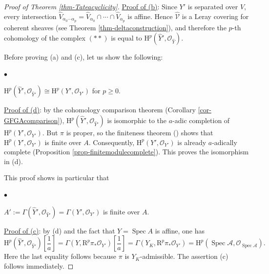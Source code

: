 \documentclass[a4paper,12pt, dvipdfmx]{jsbook}
\def\O{\mathscr{O}}
\def\Spec{\mathop{\mathrm{Spec}}\nolimits}
\def\H{\mathrm{H}}
\def\RD{\mathrm{R}}
\renewenvironment{itemize}%
{%
   \begin{list}{\parbox{1zw}{$\bullet$}}%
   {%
      \setlength{\topsep}{.5zh}
      \setlength{\itemindent}{0zw}
      \setlength{\leftmargin}{3zw}%
      \setlength{\rightmargin}{0zw}%
      \setlength{\labelsep}{.5zw}%
      \setlength{\labelwidth}{3zw}%
      \setlength{\itemsep}{0.2em}%
      \setlength{\parsep}{0em}%
      \setlength{\listparindent}{0zw}%
   }
}{%
   \end{list}%
}
\theoremstyle{plain}
\theoremstyle{definition}
\begin{document}
\begin{proof}[{{\rm Proof of Theorem \ref{thm-Tateacyclicity}}}]
\medskip\noindent
\underline{Proof of (b)}:
Since $Y'$ is separated over $V$, every intersection $\widehat{V}_{\alpha_0\cdots\alpha_p}=\widehat{V}_{\alpha_0}\cap\cdots\cap\widehat{V}_{\alpha_p}$ is affine.
Hence $\widehat{\mathcal{V}}$ is a Leray covering for coherent sheaves (see Theorem \ref{thm-deltaconstruction}), and therefore the $p$-th cohomology of the complex $(\ast\ast)$ is equal to $\H^p(\widehat{Y}',\O_{\widehat{Y}})$.

\medskip
Before proving (a) and (c), let us show the following:
\begin{itemize}
\item[(d)] $\H^p(\widehat{Y}',\O_{\widehat{Y}'})\cong\H^p(Y',\O_{Y'})$ for $p\geq 0$.
\end{itemize}

\medskip\noindent
\underline{Proof of (d)}: by the cohomology comparison theorem (Corollary \ref{cor-GFGAcomparison}), $\H^p(\widehat{Y}',\O_{\widehat{Y}'})$ is isomorphic to the $a$-adic completion of $\H^p(Y',\O_{Y'})$.
But $\pi$ is proper, so the finiteness theorem (\cite[Chap.\ III, Theorem 8.8, Remark 8.8.1]{Hart2}) shows that $\H^p(Y',\O_{Y'})$ is finite over $A$.
Consequently, $\H^p(Y',\O_{Y'})$ is already $a$-adically complete (Proposition \ref{prop-finitemodulecomplete}).
This proves the isomorphism in (d).

\medskip
This proof shows in particular that
\begin{itemize}
\item[(e)] $A':=\Gamma(\widehat{Y}',\O_{\widehat{Y}'})=\Gamma(Y',\O_{Y'})$ is finite over $A$.
\end{itemize}

\medskip\noindent
\underline{Proof of (c)}: by (d) and the fact that $Y=\Spec A$ is affine, one has
\begin{equation*}
{\textstyle \H^p(\widehat{Y}',\O_{\widehat{Y}'})[\frac{1}{a}]=\Gamma(Y,\RD^p\pi_{\ast}\O_{Y'})[\frac{1}{a}]}=\Gamma(Y_K,\RD^p\pi_{\ast}\O_{Y'})=\H^p(\Spec\mathcal{A},\O_{\Spec\mathcal{A}}).
\end{equation*}
Here the last equality follows because $\pi$ is $Y_K$-admissible.
The assertion (c) follows immediately.


\end{proof}
\end{document}
